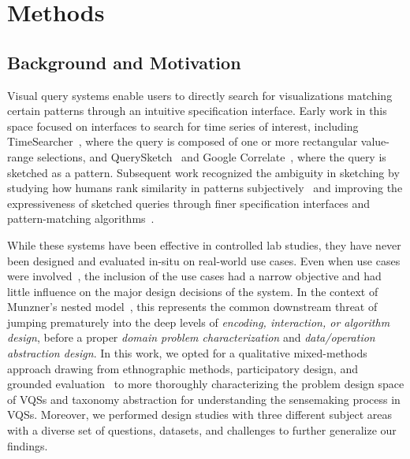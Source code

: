 
\section{Methods\label{sec:methods}}
\subsection{Background and Motivation}
\par Visual query systems enable users to directly search for visualizations matching certain patterns through an intuitive specification interface. Early work in this space focused on interfaces to search for time series of interest, including TimeSearcher~\cite{Hochheiser2001,Hochheiser2004}, where the query is composed of one or more rectangular value-range selections, and QuerySketch~\cite{wattenberg2001sketching} and Google Correlate~\cite{mohebbi2011google}, where the query is sketched as a pattern. Subsequent work recognized the ambiguity in sketching by studying how humans rank similarity in patterns subjectively~\cite{Eichmann2015,correll2016semantics,Mannino2018} and improving the expressiveness of sketched queries through finer specification interfaces and pattern-matching algorithms~\cite{ryall2005querylines,Holz2009}.
\par While these systems have been effective in controlled lab studies, they have never been designed and evaluated in-situ on real-world use cases. Even when use cases were involved~\cite{Hochheiser2004,correll2016semantics}, the inclusion of the use cases had a narrow objective and had little influence on the major design decisions of the system. In the context of Munzner's nested model~\cite{munzner2009nested}, this represents the common downstream threat of jumping prematurely into the deep levels of \textit{encoding, interaction, or algorithm design}, before a proper \textit{domain problem characterization} and \textit{data/operation abstraction design}. In this work, we opted for a qualitative mixed-methods approach drawing from ethnographic methods, participatory design, and grounded evaluation~\cite{Plaisant2004,lam2012empirical,shneiderman2006strategies,Sedlmair2012,Isenberg2008} to more thoroughly characterizing the problem design space of VQSs and taxonomy abstraction for understanding the sensemaking process in VQSs. Moreover, we performed design studies with three different subject areas with a diverse set of questions, datasets, and challenges to further generalize our findings.
